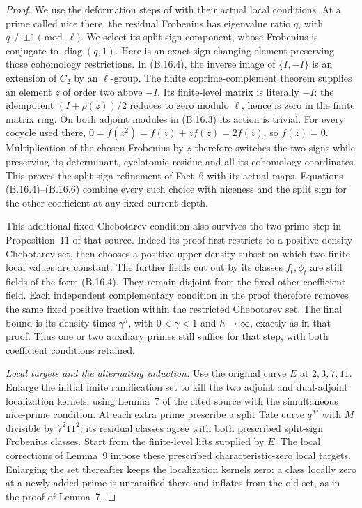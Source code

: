 \begin{proof}
We use the deformation steps of
\cite[Fact~6, Lemmas~7--9, Propositions~10--11 and \S2.2]{BIR_KLR2005}
with their actual local conditions.  At a prime called nice there,
the residual Frobenius has eigenvalue ratio $q$, with
$q\not\equiv\pm1\pmod\ell$.  We select its split-sign component,
whose Frobenius is conjugate to $\operatorname{diag}(q,1)$.
Here is an exact sign-changing element preserving those
cohomology restrictions.  In (B.16.4), the inverse image of
$\{I,-I\}$ is an extension of $C_2$ by an $\ell$-group.
The finite coprime-complement theorem supplies an element $z$
of order two above $-I$.  Its finite-level matrix is literally
$-I$: the idempotent $(I+\rho(z))/2$ reduces to zero modulo
$\ell$, hence is zero in the finite matrix ring.
On both adjoint modules in (B.16.3) its action is trivial.
For every cocycle used there,
$0=f(z^2)=f(z)+z f(z)=2f(z)$, so $f(z)=0$.
Multiplication of the chosen Frobenius by $z$ therefore
switches the two signs while preserving its determinant,
cyclotomic residue and all its cohomology coordinates.
This proves the split-sign refinement of Fact~6 with its
actual maps.  Equations (B.16.4)--(B.16.6) combine every such
choice with niceness and the split sign for the other
coefficient at any fixed current depth.

This additional fixed Chebotarev condition also survives the
two-prime step in Proposition~11 of that source.
Indeed its proof first restricts to a positive-density
Chebotarev set, then chooses a positive-upper-density subset
on which two finite local values are constant.  The further
fields cut out by its classes $f_t,\phi_t$ are still fields
of the form (B.16.4).  They remain disjoint from the fixed
other-coefficient field.  Each independent complementary
condition in the proof therefore removes the same fixed
positive fraction within the restricted Chebotarev set.
The final bound is its density times $\gamma^h$, with
$0<\gamma<1$ and $h\to\infty$, exactly as in that proof.
Thus one or two auxiliary primes still suffice for that step,
with both coefficient conditions retained.

\emph{Local targets and the alternating induction.}
Use the original curve $E$ at $2,3,7,11$.
Enlarge the initial finite ramification set to kill the two
adjoint and dual-adjoint localization kernels, using Lemma~7
of the cited source with the simultaneous nice-prime condition.
At each extra prime prescribe a split Tate curve $q^M$ with
$M$ divisible by $7^2 11^2$; its residual classes agree with
both prescribed split-sign Frobenius classes.
Start from the finite-level lifts supplied by $E$.
The local corrections of Lemma~9 impose these prescribed
characteristic-zero local targets.  Enlarging the set thereafter
keeps the localization kernels zero: a class locally zero at
a newly added prime is unramified there and inflates from the
old set, as in the proof of Lemma~7.


\end{proof}
